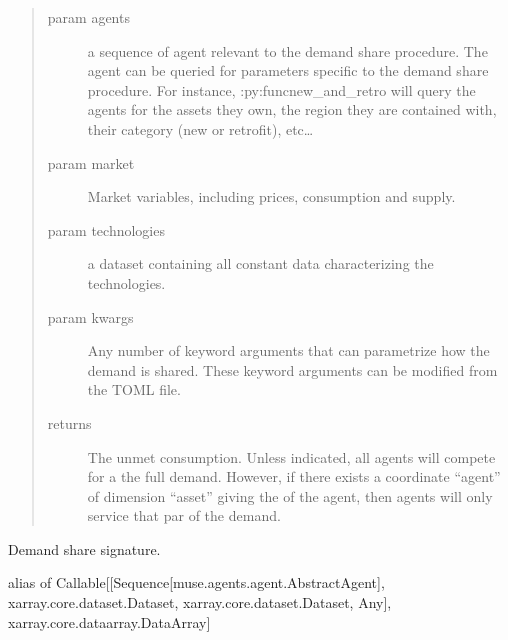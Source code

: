 \documentclass[letterpaper,10pt,english]{sphinxmanual}
\begin{document}
\begin{sphinxVerbatim}[commandchars=\\\{\}]
 
     \PYG{p}{[}\PYG{p}{]}
     
     
  
\end{sphinxVerbatim}
\begin{quote}\begin{description}
\item[{param agents}] \leavevmode
a sequence of  agent relevant to the demand share procedure. The agent can
be queried for parameters specific to the demand share procedure. For instance,
:py:func\textasciigrave{}new\_and\_retro\textasciigrave{} will query the agents for the assets they own, the
region they are contained with, their category (new or retrofit), etc…

\item[{param market}] \leavevmode
Market variables, including prices, consumption and supply.

\item[{param technologies}] \leavevmode
a dataset containing all constant data characterizing the
technologies.

\item[{param kwargs}] \leavevmode
Any number of keyword arguments that can parametrize how the demand is
shared. These keyword arguments can be modified from the TOML file.

\item[{returns}] \leavevmode
The unmet consumption. Unless indicated, all agents will compete for a the full
demand. However, if there exists a coordinate “agent” of dimension “asset” giving
the  of the agent, then agents will
only service that par of the demand.

\end{description}\end{quote}

\begin{fulllineitems}
\label{\detokenize{api:muse.demand_share.DEMAND_SHARE_SIGNATURE}}
Demand share signature.

alias of Callable{[}{[}Sequence{[}muse.agents.agent.AbstractAgent{]}, xarray.core.dataset.Dataset, xarray.core.dataset.Dataset, Any{]}, xarray.core.dataarray.DataArray{]}

\end{fulllineitems}
\end{document}
